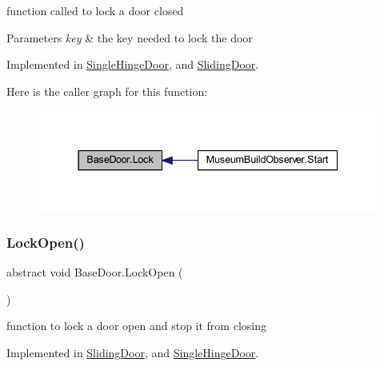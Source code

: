 function called to lock a door closed 


\begin{DoxyParams}{Parameters}
{\em key} & the key needed to lock the door\\
\hline
\end{DoxyParams}


Implemented in \mbox{\hyperlink{class_single_hinge_door_a329ff33388675ec531996bdb33dd0c70}{Single\+Hinge\+Door}}, and \mbox{\hyperlink{class_sliding_door_a2b21b6ea3181ac95520e0490c900d1a6}{Sliding\+Door}}.

Here is the caller graph for this function\+:
\nopagebreak
\begin{figure}[H]
\begin{center}
\leavevmode
\includegraphics[width=337pt]{class_base_door_a2b616c52626299f25ac25f7deab44dc4_icgraph}
\end{center}
\end{figure}
\mbox{\label{class_base_door_a9a851525c3b6e878bec459992ac75408}} 
\subsubsection{\texorpdfstring{Lock\+Open()}{LockOpen()}}
{\footnotesize\ttfamily abstract void Base\+Door.\+Lock\+Open (\begin{DoxyParamCaption}{ }\end{DoxyParamCaption})\hspace{0.3cm}{\ttfamily [pure virtual]}}



function to lock a door open and stop it from closing 



Implemented in \mbox{\hyperlink{class_sliding_door_aca96469919dc50b5b3cc77cd6f4fc7d2}{Sliding\+Door}}, and \mbox{\hyperlink{class_single_hinge_door_aea7072ec0a9ea4fc80f24dc400681478}{Single\+Hinge\+Door}}.

